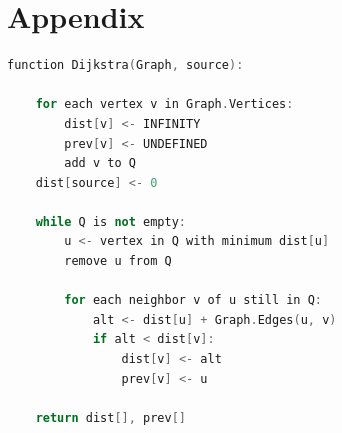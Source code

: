 \documentclass[twocolumn]{article}
\begin{document}
\section{Appendix}
\begin{lstlisting}[language=C++, caption=Djikestra Pseudo Code, style={researchpaper}, label={lst:Djikestra}]
function Dijkstra(Graph, source):
   
    for each vertex v in Graph.Vertices:
        dist[v] <- INFINITY
        prev[v] <- UNDEFINED
        add v to Q
    dist[source] <- 0
   
    while Q is not empty:
        u <- vertex in Q with minimum dist[u]
        remove u from Q
       
        for each neighbor v of u still in Q:
            alt <- dist[u] + Graph.Edges(u, v)
            if alt < dist[v]:
                dist[v] <- alt
                prev[v] <- u

    return dist[], prev[]
\end{lstlisting}
\end{document}
